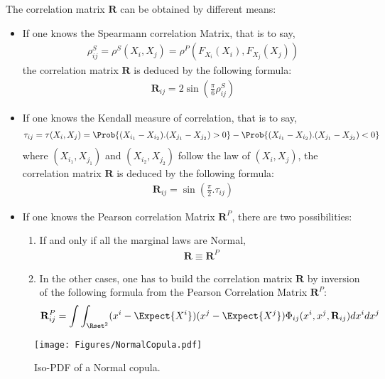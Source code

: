 {  The correlation matrix $\mathbf R$ can be obtained by different means:
  \begin{itemize}
  \item If one knows the Spearmann correlation Matrix, that is to say,
    \begin{align*}
      \rho_{ij}^S = \rho^S(X_i,X_j) = \rho^P(F_{X_i}(X_i),F_{X_j}(X_j))
    \end{align*}
    the correlation matrix $\mathbf R$ is deduced by the following formula:
    \begin{align*}
      \mathbf R_{ij} = 2 \sin(\frac{\pi}{6}\rho_{ij}^S)
    \end{align*}
  \item If one knows the Kendall measure of correlation, that is to say,
    \begin{align*}
      \tau_{ij} = \tau(X_i,X_j) = \Prob{(X_{i_1} - X_{i_2}).(X_{j_1} - X_{j_2}) > 0} - \Prob{(X_{i_1} - X_{i_2}).(X_{j_1} - X_{j_2}) < 0}
    \end{align*}
    where $(X_{i_1},X_{j_1})$ and $(X_{i_2},X_{j_2})$ follow the law of $(X_i,X_j)$,
    the correlation matrix $\mathbf R$ is deduced by the following formula:
    \begin{align*}
      \mathbf R_{ij} = \sin(\frac{\pi}{2} . \tau_{ij})
    \end{align*}
  \item If one knows the Pearson correlation Matrix $\mathbf R^P$, there are two possibilities:
    \begin{enumerate}
    \item       If and only if all the marginal laws are Normal,
      \begin{align*}
        \mathbf R \equiv \mathbf R^P
      \end{align*}
    \item
      In the other cases, one has to build the correlation matrix $\mathbf R$ by inversion of the following formula from the Pearson Correlation Matrix $\mathbf R^P$:
      \begin{align*}
        \mathbf R_{ij}^P = \int \int_{\Rset^2} (x^i-\Expect{X^i})(x^j-\Expect{X^j}) \Phi_{ij}(x^i,x^j,\mathbf R_{ij})dx^i dx^j
      \end{align*}
    \end{enumerate}
  \end{itemize}




  \begin{figure}[H]
    \begin{center}
      \texttt{[image: Figures/NormalCopula.pdf]}
      \caption{Iso-PDF of a  Normal copula.}
    \end{center}
  \end{figure}






}
